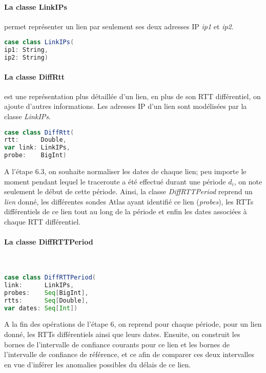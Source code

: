 \paragraph{La classe LinkIPs} permet représenter un lien par seulement ses deux adresses IP \textit{ip1} et \textit{ip2}.
\begin{lstlisting}[language=scala]
case class LinkIPs(
ip1: String,
ip2: String)
\end{lstlisting}

\paragraph{La classe DiffRtt} est une représentation plus détaillée d'un lien, en plus de son RTT différentiel, on ajoute d'autres informations.  Les adresses IP d'un lien sont modélisées par la classe \textit{LinkIPs}.

\begin{lstlisting}[language=scala]
case class DiffRtt(
rtt:      Double,
var link: LinkIPs,
probe:    BigInt)
\end{lstlisting}

A l'étape 6.3, on souhaite normaliser les dates de chaque lien; peu importe le moment pendant lequel le traceroute a été effectué durant une période $d_i$, on note seulement le début de cette période. Ainsi,  la classe  \textit{DiffRTTPeriod}  reprend un \textit{lien} donné, les différentes sondes Atlas ayant identifié ce lien (\textit{probes}), les RTTs différentiels de ce lien tout au long de la période et enfin les dates associées à chaque RTT différentiel.
\paragraph{La classe DiffRTTPeriod } ~
\begin{lstlisting}[language=scala]
case class DiffRTTPeriod(
link:      LinkIPs,
probes:    Seq[BigInt],
rtts:      Seq[Double],
var dates: Seq[Int])
\end{lstlisting}

A la fin des opérations de l'étape 6, on reprend pour chaque période, pour un lien donné, les RTTs différentiels ainsi que leurs dates. Ensuite, on construit les bornes de l'intervalle de confiance courants pour ce lien et les bornes de l'intervalle de confiance de référence, et ce afin de comparer ces deux intervalles en vue d'inférer les anomalies possibles du délais de ce lien.


